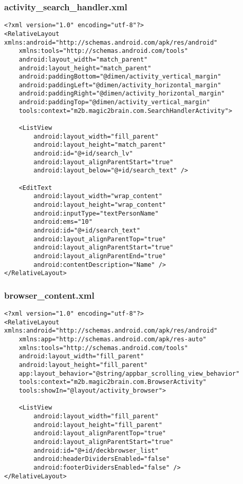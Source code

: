 \subsubsection{activity\_search\_handler.xml}
\begin{lstlisting}
<?xml version="1.0" encoding="utf-8"?>
<RelativeLayout xmlns:android="http://schemas.android.com/apk/res/android"
    xmlns:tools="http://schemas.android.com/tools"
    android:layout_width="match_parent"
    android:layout_height="match_parent"
    android:paddingBottom="@dimen/activity_vertical_margin"
    android:paddingLeft="@dimen/activity_horizontal_margin"
    android:paddingRight="@dimen/activity_horizontal_margin"
    android:paddingTop="@dimen/activity_vertical_margin"
    tools:context="m2b.magic2brain.com.SearchHandlerActivity">

    <ListView
        android:layout_width="fill_parent"
        android:layout_height="match_parent"
        android:id="@+id/search_lv"
        android:layout_alignParentStart="true"
        android:layout_below="@+id/search_text" />

    <EditText
        android:layout_width="wrap_content"
        android:layout_height="wrap_content"
        android:inputType="textPersonName"
        android:ems="10"
        android:id="@+id/search_text"
        android:layout_alignParentTop="true"
        android:layout_alignParentStart="true"
        android:layout_alignParentEnd="true"
        android:contentDescription="Name" />
</RelativeLayout>
\end{lstlisting}

\subsubsection{browser\_content.xml}
\begin{lstlisting}
<?xml version="1.0" encoding="utf-8"?>
<RelativeLayout xmlns:android="http://schemas.android.com/apk/res/android"
    xmlns:app="http://schemas.android.com/apk/res-auto"
    xmlns:tools="http://schemas.android.com/tools"
    android:layout_width="fill_parent"
    android:layout_height="fill_parent"
    app:layout_behavior="@string/appbar_scrolling_view_behavior"
    tools:context="m2b.magic2brain.com.BrowserActivity"
    tools:showIn="@layout/activity_browser">

    <ListView
        android:layout_width="fill_parent"
        android:layout_height="fill_parent"
        android:layout_alignParentTop="true"
        android:layout_alignParentStart="true"
        android:id="@+id/deckbrowser_list"
        android:headerDividersEnabled="false"
        android:footerDividersEnabled="false" />
</RelativeLayout>
\end{lstlisting}

